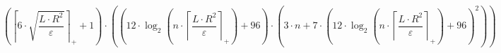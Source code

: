 \[\left(\left\lceil 6 \cdot \sqrt{\frac{L \cdot R^{2}}{\varepsilon}} \right\rceil_{+} + 1\right) \cdot \left(\left(12 \cdot \log_{2}\left(n \cdot \left\lceil \frac{L \cdot R^{2}}{\varepsilon} \right\rceil_{+}\right) + 96\right) \cdot \left(3 \cdot n + 7 \cdot \left(12 \cdot \log_{2}\left(n \cdot \left\lceil \frac{L \cdot R^{2}}{\varepsilon} \right\rceil_{+}\right) + 96\right)^{2}\right)\right)\]
